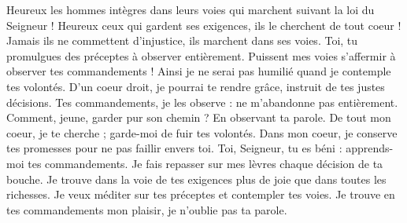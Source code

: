 Heureux les hommes intègres dans leurs voies qui marchent suivant la loi du Seigneur !
\versseparator
Heureux ceux qui gardent ses exigences, ils le cherchent de tout coeur !
\versseparator
Jamais ils ne commettent d'injustice, ils marchent dans ses voies.
\versseparator
Toi, tu promulgues des préceptes à observer entièrement.
\versseparator
Puissent mes voies s'affermir à observer tes commandements !
\versseparator
Ainsi je ne serai pas humilié quand je contemple tes volontés.
\versseparator
D'un coeur droit, je pourrai te rendre grâce, instruit de tes justes décisions.
\versseparator
Tes commandements, je les observe : ne m'abandonne pas entièrement.
\versseparator
Comment, jeune, garder pur son chemin ? En observant ta parole.
\versseparator
De tout mon coeur, je te cherche ; garde-moi de fuir tes volontés.
\versseparator
Dans mon coeur, je conserve tes promesses pour ne pas faillir envers toi.
\versseparator
Toi, Seigneur, tu es béni : apprends-moi tes commandements.
\versseparator
Je fais repasser sur mes lèvres chaque décision de ta bouche.
\versseparator
Je trouve dans la voie de tes exigences plus de joie que dans toutes les richesses.
\versseparator
Je veux méditer sur tes préceptes et contempler tes voies.
\versseparator
Je trouve en tes commandements mon plaisir, je n'oublie pas ta parole.